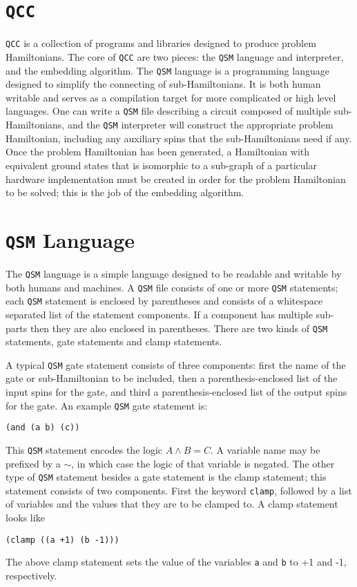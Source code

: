 \section{\texttt{QCC}}
\texttt{QCC} is a collection of programs and libraries designed to produce problem Hamiltonians.  The core of \texttt{QCC} are two pieces: the \texttt{QSM} language and interpreter, and the embedding algorithm.  The \texttt{QSM} language is a programming language designed to simplify the connecting of sub-Hamiltonians.  It is both human writable and serves as a compilation target for more complicated or high level languages.  One can write a \texttt{QSM} file describing a circuit composed of multiple sub-Hamiltonians, and the \texttt{QSM} interpreter will construct the appropriate problem Hamiltonian, including any auxiliary spins that the sub-Hamiltonians need if any.  Once the problem Hamiltonian has been generated, a Hamiltonian with equivalent ground states that is isomorphic to a sub-graph of a particular hardware implementation must be created in order for the problem Hamiltonian to be solved; this is the job of the embedding algorithm.

\section{\texttt{QSM} Language}
The \texttt{QSM} language is a simple language designed to be readable and writable by both humans and machines.  A \texttt{QSM} file consists of one or more \texttt{QSM} statements; each \texttt{QSM} statement is enclosed by parentheses and consists of a whitespace separated list of the statement components.  If a component has multiple sub-parts then they are also enclosed in parentheses.  There are two kinds of \texttt{QSM} statements, gate statements and clamp statements.

A typical \texttt{QSM} gate statement consists of three components: first the name of the gate or sub-Hamiltonian to be included, then a parenthesis-enclosed list of the input spins for the gate, and third a parenthesis-enclosed list of the output spins for the gate.  An example \texttt{QSM} gate statement is: 
\begin{center}
	\texttt{(and (a b) (c))}
\end{center}
This \texttt{QSM} statement encodes the logic $A \wedge B = C$.  A variable name may be prefixed by a $\sim$, in which case the logic of that variable is negated.  The other type of \texttt{QSM} statement besides a gate statement is the clamp statement; this statement consists of two components.  First the keyword \texttt{clamp}, followed by a list of variables and the values that they are to be clamped to.  A clamp statement looks like
\begin{center}
	\texttt{(clamp ((a +1) (b -1)))}
\end{center}
The above clamp statement sets the value of the variables \texttt{a} and \texttt{b} to +1 and -1, respectively.

